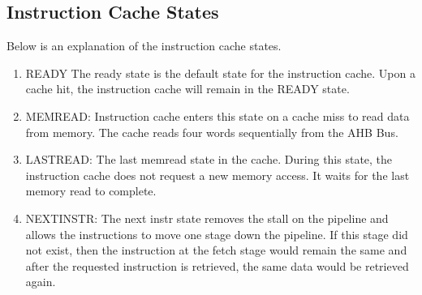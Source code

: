 \subsection{Instruction Cache States}
\label{sec:istate}

Below is an explanation of the instruction cache states.

\begin{enumerate}
	\item READY 
	The ready state is the default state for the instruction cache.
	Upon a cache hit, the instruction cache will remain in the READY state.

	\item MEMREAD:
	Instruction cache enters this state on a cache miss to read data from memory.
	The cache reads four words sequentially from the AHB Bus.

	\item LASTREAD:
	The last memread state in the cache. 
	During this state, the instruction cache does not request a new memory access.
	It waits for the last memory read to complete.

	\item NEXTINSTR:
	The next instr state removes the stall on the pipeline and allows the instructions to move one stage down the pipeline. If this stage did not exist, then the instruction at the fetch stage would remain the same and after the requested instruction is retrieved, the same data would be retrieved again. 

\end{enumerate}
